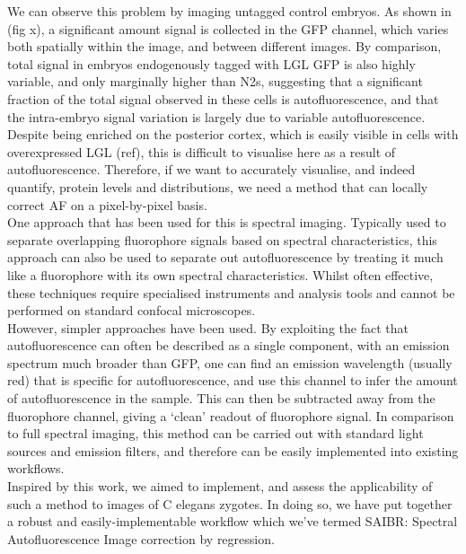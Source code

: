 \documentclass[12pt]{"article"}
\begin{document}
We can observe this problem by imaging untagged control embryos. As shown in (fig x), a significant amount signal is collected in the GFP channel, which varies both spatially within the image, and between different images. By comparison, total signal in embryos endogenously tagged with LGL GFP is also highly variable, and only marginally higher than N2s, suggesting that a significant fraction of the total signal observed in these cells is autofluorescence, and that the intra-embryo signal variation is largely due to variable autofluorescence. Despite being enriched on the posterior cortex, which is easily visible in cells with overexpressed LGL (ref), this is difficult to visualise here as a result of autofluorescence. Therefore, if we want to accurately visualise, and indeed quantify, protein levels and distributions, we need a method that can locally correct AF on a pixel-by-pixel basis.\\


One approach that has been used for this is spectral imaging. Typically used to separate overlapping fluorophore signals based on spectral characteristics, this approach can also be used to separate out autofluorescence by treating it much like a fluorophore with its own spectral characteristics. Whilst often effective, these techniques require specialised instruments and analysis tools and cannot be performed on standard confocal microscopes.\\

However, simpler approaches have been used. By exploiting the fact that autofluorescence can often be described as a single component, with an emission spectrum much broader than GFP, one can find an emission wavelength (usually red) that is specific for autofluorescence, and use this channel to infer the amount of autofluorescence in the sample. This can then be subtracted away from the fluorophore channel, giving a ‘clean’ readout of fluorophore signal. In comparison to full spectral imaging, this method can be carried out with standard light sources and emission filters, and therefore can be easily implemented into existing workflows.\\

Inspired by this work, we aimed to implement, and assess the applicability of such a method to images of C elegans zygotes. In doing so, we have put together a robust and easily-implementable workflow which we’ve termed SAIBR: Spectral Autofluorescence Image correction by regression.\\
\end{document}
